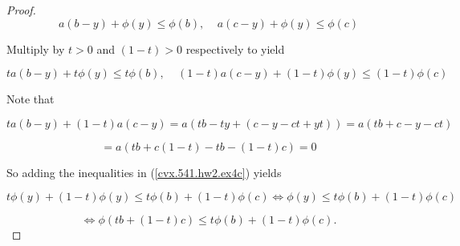 \begin{proof}
\[
a(b-y)+\phi(y) \leq \phi(b), \ \ \ \ \ a(c-y) + \phi(y) \leq \phi(c)
\]

Multiply by \(t > 0\) and \((1-t) > 0\) respectively to yield

\begin{equation}\label{cvx.541.hw2.ex4c}
ta(b-y)+ t\phi(y) \leq t\phi(b), \ \ \ \ \ (1-t)a(c-y) + (1-t)\phi(y) \leq (1-t)\phi(c)
\end{equation}

Note that 

\[
t a(b-y) + (1-t)a(c-y) = a(tb -ty + (c - y - ct + yt)) = a(tb  + c - y - ct )
\]

\[
= a(tb  + c(1-t) - tb - (1-t)c) = 0
\]

So adding the inequalities in (\ref{cvx.541.hw2.ex4c}) yields

\[
 t\phi(y) +  (1-t)\phi(y) \leq t\phi(b) + (1-t)\phi(c) \iff \phi(y) \leq  t\phi(b) + (1-t)\phi(c) 
\]

\[
\iff \phi( tb + (1-t)c  ) \leq  t\phi(b) + (1-t)\phi(c) .
\]

\end{proof}

